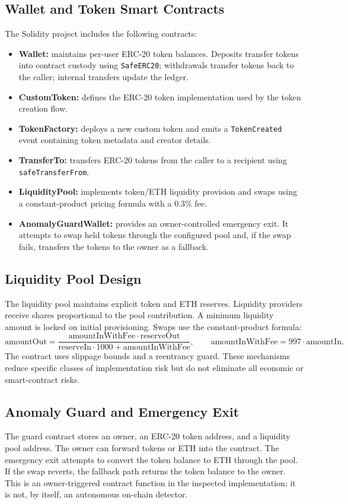 \documentclass{tietreport}
\begin{document}
\subsection{Wallet and Token Smart Contracts}
The Solidity project includes the following contracts:
\begin{itemize}
  \item \textbf{Wallet:} maintains per-user ERC-20 token balances. Deposits
  transfer tokens into contract custody using \texttt{SafeERC20}; withdrawals
  transfer tokens back to the caller; internal transfers update the ledger.
  \item \textbf{CustomToken:} defines the ERC-20 token implementation used by
  the token creation flow.
  \item \textbf{TokenFactory:} deploys a new custom token and emits a
  \texttt{TokenCreated} event containing token metadata and creator details.
  \item \textbf{TransferTo:} transfers ERC-20 tokens from the caller to a
  recipient using \texttt{safeTransferFrom}.
  \item \textbf{LiquidityPool:} implements token/ETH liquidity provision and
  swaps using a constant-product pricing formula with a 0.3\% fee.
  \item \textbf{AnomalyGuardWallet:} provides an owner-controlled emergency
  exit. It attempts to swap held tokens through the configured pool and, if
  the swap fails, transfers the tokens to the owner as a fallback.
\end{itemize}

\subsection{Liquidity Pool Design}
The liquidity pool maintains explicit token and ETH reserves. Liquidity
providers receive shares proportional to the pool contribution. A minimum
liquidity amount is locked on initial provisioning. Swaps use the
constant-product formula:
\[
  \mathrm{amountOut} =
  \frac{\mathrm{amountInWithFee}\cdot \mathrm{reserveOut}}
       {\mathrm{reserveIn}\cdot 1000+\mathrm{amountInWithFee}},
  \qquad
  \mathrm{amountInWithFee}=997\cdot\mathrm{amountIn}.
\]
The contract uses slippage bounds and a reentrancy guard. These mechanisms
reduce specific classes of implementation risk but do not eliminate all
economic or smart-contract risks.

\subsection{Anomaly Guard and Emergency Exit}
The guard contract stores an owner, an ERC-20 token address, and a liquidity
pool address. The owner can forward tokens or ETH into the contract. The
emergency exit attempts to convert the token balance to ETH through the pool.
If the swap reverts, the fallback path returns the token balance to the owner.
This is an owner-triggered contract function in the inspected implementation;
it is not, by itself, an autonomous on-chain detector.
\end{document}
